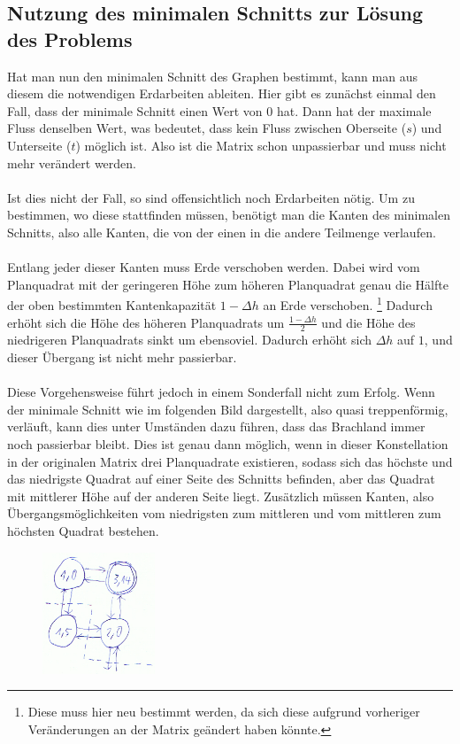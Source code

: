 \documentclass[a4paper, notitlepage, 12pt]{scrartcl}
\begin{document}
 \subsection{Nutzung des minimalen Schnitts zur Lösung des Problems}
 \label{sec:loesprob}
Hat man nun den minimalen Schnitt des Graphen bestimmt, kann man aus diesem die notwendigen Erdarbeiten ableiten. Hier gibt es zunächst einmal den Fall, dass der minimale Schnitt einen Wert von 0 hat. Dann hat der maximale Fluss denselben Wert, was bedeutet, dass kein Fluss zwischen Oberseite ($s$) und Unterseite ($t$) möglich ist. Also ist die Matrix schon unpassierbar und muss nicht mehr verändert werden. \\ \\
Ist dies nicht der Fall, so sind offensichtlich noch Erdarbeiten nötig. Um zu bestimmen, wo diese stattfinden müssen, benötigt man die Kanten des minimalen Schnitts, also alle Kanten, die von der einen in die andere Teilmenge verlaufen. \\ \\
Entlang jeder dieser Kanten muss Erde verschoben werden. Dabei wird vom Planquadrat mit der geringeren Höhe zum höheren Planquadrat genau die Hälfte der oben bestimmten Kantenkapazität $ 1 - \Delta h$ an Erde verschoben. \footnote{Diese muss hier neu bestimmt werden, da sich diese aufgrund vorheriger Veränderungen an der Matrix geändert haben könnte.} Dadurch erhöht sich die Höhe des höheren Planquadrats um $ \frac{1 - \Delta h}{2}$ und die Höhe des niedrigeren Planquadrats sinkt um ebensoviel. Dadurch erhöht sich $\Delta h$ auf $1$, und dieser Übergang ist nicht mehr passierbar. \\ \\
Diese Vorgehensweise führt jedoch in einem Sonderfall nicht zum Erfolg. Wenn der minimale Schnitt wie im folgenden Bild dargestellt, also quasi treppenförmig, verläuft, kann dies unter Umständen dazu führen, dass das Brachland immer noch passierbar bleibt. Dies ist genau dann möglich, wenn in dieser Konstellation in der originalen Matrix drei Planquadrate existieren, sodass sich das höchste und das niedrigste Quadrat auf einer Seite des Schnitts befinden, aber das Quadrat mit mittlerer Höhe auf der anderen Seite liegt. Zusätzlich müssen Kanten, also Übergangsmöglichkeiten vom niedrigsten zum mittleren und vom mittleren zum höchsten Quadrat bestehen.
\begin{figure}[H]
\centering \includegraphics[width=0.3\textwidth]{pics/ill-cut.png}
\end{figure}
\end{document}
